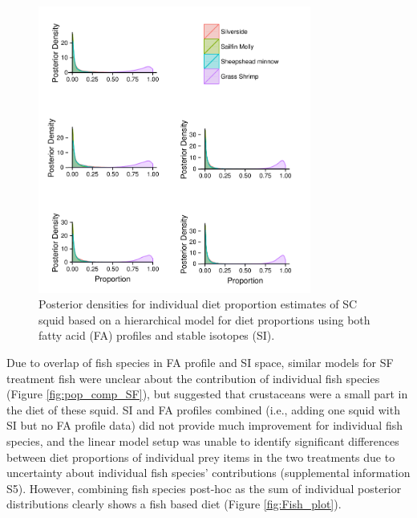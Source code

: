 \documentclass[fleqn,10pt]{wlpeerj}
\begin{document}
\begin{figure}
  \begin{center}
    \includegraphics[width=0.8\textwidth]{figures/Ind_FAP_SC_long.pdf}   
    \caption{Posterior densities for individual diet proportion
      estimates of SC squid based on a hierarchical
      model for diet proportions using both fatty acid (FA) profiles and stable isotopes (SI).}
    \label{fig:ind_est}
  \end{center}
\end{figure}

Due to overlap of fish species in FA profile and SI space, similar models for
SF treatment fish were unclear about the contribution of individual
fish species (Figure \ref{fig:pop_comp_SF}), but suggested that
crustaceans were a small part in the diet of these squid. SI and FA profiles
combined (i.e., adding one squid with SI but no FA profile data) did not
provide much improvement for individual fish species, and the linear model setup was unable to identify significant differences
between diet proportions of individual prey items in the two
treatments due to uncertainty about individual fish species'
contributions (supplemental information S5). However, combining fish species post-hoc as the sum of individual posterior
distributions clearly shows a fish based diet
(Figure \ref{fig:Fish_plot}). 
\end{document}

